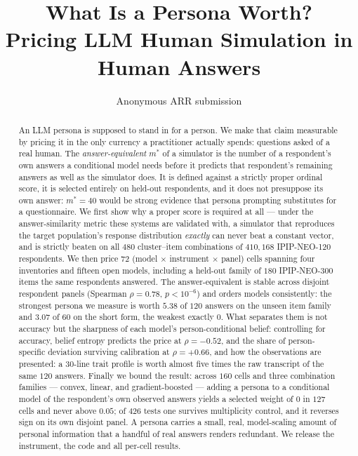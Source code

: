 \documentclass[11pt]{article}
\title{What Is a Persona Worth?\\
Pricing LLM Human Simulation in Human Answers}
\author{Anonymous ARR submission}
\begin{document}
\maketitle

\begin{abstract}
An LLM persona is supposed to stand in for a person. We make that claim
measurable by pricing it in the only currency a practitioner actually spends:
questions asked of a real human. The \emph{answer-equivalent} $m^{*}$ of a
simulator is the number of a respondent's own answers a conditional model needs
before it predicts that respondent's remaining answers as well as the simulator
does. It is defined against a strictly proper ordinal score, it is selected
entirely on held-out respondents, and it does not presuppose its own answer:
$m^{*}{=}40$ would be strong evidence that persona prompting substitutes for a
questionnaire. We first show why a proper score is required at all --- under the
answer-similarity metric these systems are validated with, a simulator that
reproduces the target population's response distribution \emph{exactly} can never
beat a constant vector, and is strictly beaten on all $480$ cluster--item
combinations of $410{,}168$ IPIP-NEO-120 respondents. We then price $72$
(model $\times$ instrument $\times$ panel) cells spanning four inventories and
fifteen open models, including a held-out family of $180$ IPIP-NEO-300 items the
same respondents answered. The answer-equivalent is stable across disjoint
respondent panels (Spearman $\rho{=}0.78$, $p{<}10^{-6}$) and orders models
consistently: the strongest persona we measure is worth $5.38$ of $120$ answers
on the unseen item family and $3.07$ of $60$ on the short form, the weakest
exactly $0$. What separates them is not accuracy but the sharpness of each model's
person-conditional belief: controlling for accuracy, belief entropy predicts the
price at $\rho{=}-0.52$, and the share of person-specific deviation surviving
calibration at $\rho{=}+0.66$, and how the observations are presented: a $30$-line trait profile is
worth almost five times the raw transcript of the same $120$ answers. Finally we
bound the result: across $160$ cells and three combination families --- convex,
linear, and gradient-boosted --- adding a persona to a conditional model of the
respondent's own observed answers yields a selected weight of $0$ in $127$ cells
and never above $0.05$; of $426$ tests one survives multiplicity control, and it
reverses sign on its own disjoint panel. A persona carries a small,
real, model-scaling amount of personal information that a handful of real answers
renders redundant. We release the instrument, the code and all per-cell results.
\end{abstract}
\end{document}
